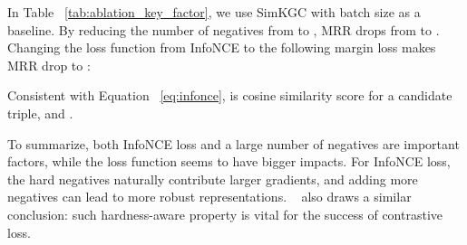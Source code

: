 \documentclass[11pt]{article}
\begin{document}
\begin{table*}[ht]
\centering
{}
\caption{Examples of SimKGC prediction results on the test set of the Wikidata5M-Trans dataset.
The entity to predict is in bold font.
We only show a snippet of relevant texts in the row of ``evidence'' for space reason.}
\label{tab:case_analysis}
\end{table*}

In Table ~\ref{tab:ablation_key_factor},
we use SimKGC with batch size  as a baseline.
By reducing the number of negatives from  to ,
MRR drops from  to .
Changing the loss function from InfoNCE to the following margin loss makes MRR drop to :

Consistent with Equation ~\ref{eq:infonce},
 is cosine similarity score for a candidate triple,
and .

To summarize,
both InfoNCE loss and a large number of negatives are important factors,
while the loss function seems to have bigger impacts.
For InfoNCE loss,
the hard negatives naturally contribute larger gradients,
and adding more negatives can lead to more robust representations.
~\citet{Wang2021UnderstandingTB} also draws a similar conclusion:
such hardness-aware property is vital for the success of contrastive loss.
\end{document}
